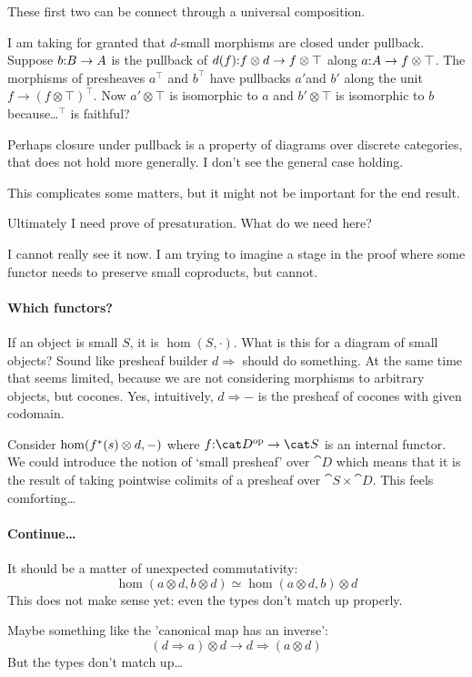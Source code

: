 \documentclass[csh.tex]{subfiles}
\begin{document}
These first two can be connect through a universal composition. 

I am taking for granted that $d$-small morphisms are closed under pullback. Suppose $b\mathord : B\to A$ is the pullback of $d(f)\mathord : f\otimes d\to f\otimes \top$ along $a\mathord : A \to f\otimes \top$. The morphisms of presheaves $a^\top$ and $b^\top$ have pullbacks $a'$and $b'$ along the unit $f\to(f\otimes \top)^\top$. Now $a'\otimes \top$ is isomorphic to $a$ and $b'\otimes \top$ is isomorphic to $b$ because\dots $^\top$ is faithful?

Perhaps closure under pullback is a property of diagrams over discrete categories, that does not hold more generally. I don't see the general case holding.

This complicates some matters, but it might not be important for the end result.

Ultimately I need prove of presaturation. What do we need here?

I cannot really see it now. I am trying to imagine a stage in the proof where some functor needs to preserve small coproducts, but cannot.

\paragraph{Which functors?}
If an object is small $S$, it is $\hom(S,\cdot)$. What is this for a diagram of small objects? Sound like presheaf builder $d\Rightarrow$ should do something. At the same time that seems limited, because we are not considering morphisms to arbitrary objects, but cocones. Yes, intuitively, $d\Rightarrow -$ is the presheaf of cocones with given codomain.

Consider $\hom(f^*(s)\otimes d,-)$ where $f\of \cat D\dual\to\cat S$ is an internal functor. We could introduce the notion of `small presheaf' over $\cat D$ which means that it is the result of taking pointwise colimits of a presheaf over $\cat S\times \cat D$. This feels comforting\dots

\paragraph{Continue\dots}
It should be a matter of unexpected commutativity:
\[ \hom(a\otimes d,b\otimes d) \simeq \hom(a\otimes d, b)\otimes d \]
This does not make sense yet: even the types don't match up properly.

Maybe something like the 'canonical map has an inverse':
\[ (d\Rightarrow a)\otimes d \to d\Rightarrow(a\otimes d) \]
But the types don't match up\dots
\end{document}
